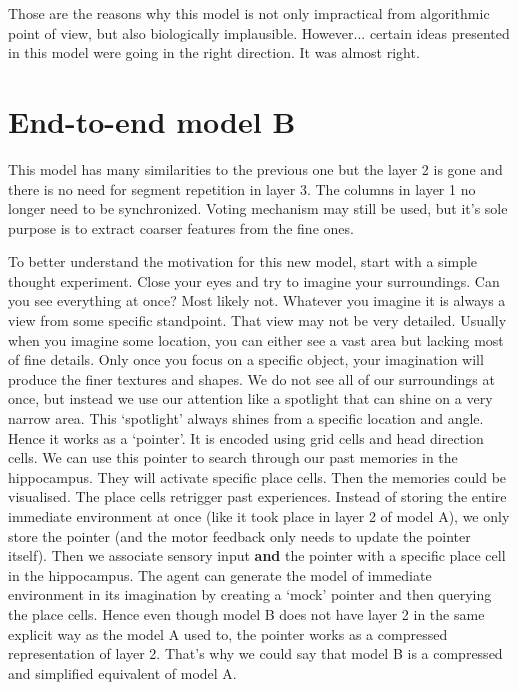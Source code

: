 \documentclass[12pt]{article}
\begin{document}
Those are the reasons why this model is not only impractical from algorithmic point of view, but also biologically implausible. However... certain ideas presented in this model were going in the right direction. It was almost right. 


\section{End-to-end model B}

This model has many similarities to the previous one but the layer 2 is gone and there is no need for segment repetition in layer 3. The columns in layer 1 no longer need to be synchronized. Voting mechanism may still be used, but it's sole purpose is to extract coarser features from the fine ones. 

To better understand the motivation for this new model, start with a simple thought experiment. Close your eyes and try to imagine your surroundings. Can you see everything at once? Most likely not. Whatever you imagine it is always a view from some specific standpoint. That view may not be very detailed. Usually when you imagine some location, you can either see a vast area but lacking most of fine details. Only once you focus on a specific object, your imagination will produce the finer textures and shapes. We do not see all of our surroundings at once, but instead we use our attention like a spotlight that can shine on a very narrow area. This `spotlight' always shines from a specific location and angle. Hence it works as a `pointer'. It is encoded using grid cells and head direction cells. We can use this pointer to search through our past memories in the hippocampus. They will activate specific place cells. Then the memories could be visualised. The place cells retrigger past experiences. Instead of storing the entire immediate environment at once (like it took place in layer 2 of model A), we only store the pointer (and the motor feedback only needs to update the pointer itself). Then we associate sensory input \textbf{and} the pointer with a specific place cell in the hippocampus. The agent can generate the model of immediate environment  in its imagination by creating a `mock' pointer and then querying the place cells. Hence even though model B does not have layer 2 in the same explicit way as the model A used to, the pointer works as a compressed representation of layer 2. That's why we could say that model B is a compressed and simplified equivalent of model A.
\end{document}
